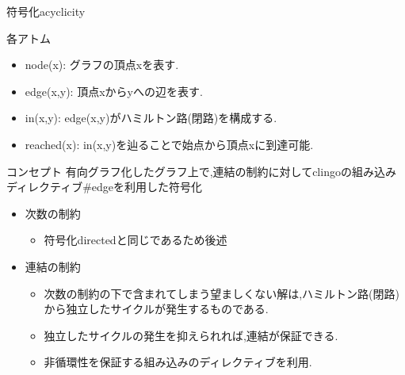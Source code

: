 \documentclass[dvipdfmx,11pt]{beamer}
\begin{document}
\begin{frame}[fragile]{符号化acyclicity}
  \begin{block}{各アトム}
    \begin{itemize}
    \item \small{\alert{node(x)}: グラフの頂点xを表す.}
    \item \small{\alert{edge(x,y)}: 頂点xからyへの辺を表す.}
    \item \small{\alert{in(x,y)}: edge(x,y)がハミルトン路(閉路)を構成する.}
    \item \small{\alert{reached(x)}: in(x,y)を辿ることで始点から頂点xに到達可能.}
    \end{itemize}
  \end{block}
  \begin{alertblock}{コンセプト}
    有向グラフ化したグラフ上で,連結の制約に対してclingoの組み込みディレクティブ\#edgeを利用した符号化
  \end{alertblock}
  \begin{itemize}
  \item \alert{次数の制約}
    \begin{itemize}
    \item 符号化directedと同じであるため後述
    \end{itemize}
  \item \alert{連結の制約}
    \begin{itemize}
    \item 次数の制約の下で含まれてしまう望ましくない解は,ハミルトン路(閉路)から独立したサイクルが発生するものである.
    \item 独立したサイクルの発生を抑えられれば,連結が保証できる.
    \item 非循環性を保証する組み込みのディレクティブを利用.
    \end{itemize}
  \end{itemize}
\end{frame}
\end{document}
